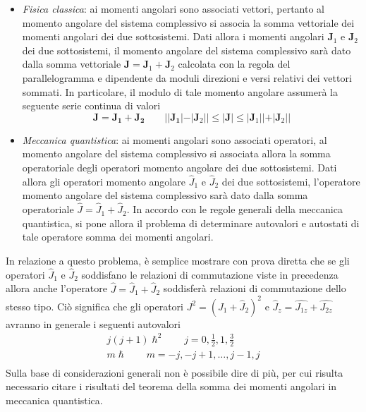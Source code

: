 \begin{itemize}
	\tightlist
	\item
	      \emph{Fisica classica}: ai momenti angolari sono associati vettori,
	      pertanto al momento angolare del sistema complessivo si associa la
	      somma vettoriale dei momenti angolari dei due sottosistemi.
	      Dati
	      allora i momenti angolari \(\bm{J}_{1}\) e \(\bm{J}_{2}\) dei due
	      sottosistemi, il momento angolare del sistema complessivo sarà dato
	      dalla somma vettoriale \(\bm{J} = \bm{J}_{1}+ \bm{J}_{2}\) calcolata
	      con la regola del parallelogramma e dipendente da moduli direzioni e
	      versi relativi dei vettori sommati.
	      In particolare, il modulo di tale
	      momento angolare assumerà la seguente serie continua di valori \[
		      \bm{J} = \bm{J_{1}} + \bm{J_{2}} \qquad | |\bm{J_{1}}| - |\bm{J}_{2}| | \leq | \bm{J}| \leq|\bm{J}_{1} | | + | \bm{J}_{2} | |
	      \]
	\item
	      \emph{Meccanica quantistica}: ai momenti angolari sono associati
	      operatori, al momento angolare del sistema complessivo si associata
	      allora la somma operatoriale degli operatori momento angolare dei due
	      sottosistemi.
	      Dati allora gli operatori momento angolare
	      \(\hat{J}_{1}\) e \(\hat{J}_{2}\) dei due sottosistemi, l'operatore
	      momento angolare del sistema complessivo sarà dato dalla somma
	      operatoriale \(\hat{J} = \hat{J}_{1}+ \hat{J}_{2}\).
	      In accordo con le
	      regole generali della meccanica quantistica, si pone allora il
	      problema di determinare autovalori e autostati di tale operatore somma
	      dei momenti angolari.
\end{itemize}

In relazione a questo problema, è semplice mostrare con prova diretta
che se gli operatori \(\hat{J}_{1}\) e \(\hat{J}_{2}\) soddisfano le
relazioni di commutazione viste in precedenza allora anche l'operatore
\(\hat{J} = \hat{J}_{1}+ \hat{J}_{2}\) soddisferà relazioni di
commutazione dello stesso tipo.
Ciò significa che gli operatori
\(J^{2} = (J_{1} + \hat{J}_{2})^{2}\) e
\(\hat{J}_{z} = \hat{J_{1z}} + \hat{J_{2z}}\) avranno in generale i
seguenti autovalori \begin{gather*}
	j(j+1) \hslash^{2} \qquad j = 0, \frac{1}{2}, 1, \frac{3}{2}\\
	m \hslash  \qquad m = -j , -j +1, \dots , j-1, j\\
\end{gather*} Sulla base di considerazioni generali non è possibile dire di più,
per cui risulta necessario citare i risultati del teorema della somma
dei momenti angolari in meccanica quantistica.

